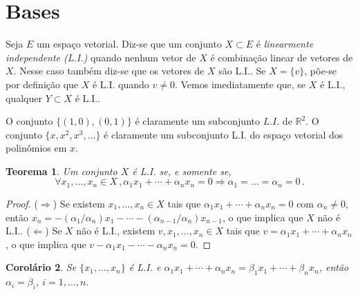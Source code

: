 \documentclass[12pt,a4paper]{article}
\newcommand{\R}{\mathbb{R}}
\newtheorem{thm}{Teorema}[section]
\newtheorem{cor}[thm]{Corolário}
\theoremstyle{definition}
\begin{document}



\section{Bases}

Seja $E$ um espaço vetorial. Diz-se que um conjunto $X\subset E$ é
\textit{linearmente independente (L.I.)} quando nenhum vetor de $X$ é
combinação linear de vetores de $X$. Nesse caso também diz-se que os
vetores de $X$ são L.I.. Se $X=\{v\}$, põe-se por definição que $X$ é
L.I. quando $v\ne 0$. Vemos imediatamente que, se $X$ é L.I., qualquer
$Y\subset X$ é L.I..

O conjunto $\{(1,0), (0,1)\}$ é claramente um subconjunto $L.I.$ de
$\R^2$. O conjunto $\{x, x^2,x^3,\ldots\}$ é claramente um subconjunto
L.I. do espaço vetorial dos polinômios em $x$.

\begin{thm}
  Um conjunto $X$ é L.I. se, e somente se,
  $$\forall x_1,\ldots,x_n\in X\,, \alpha_1x_1+\cdots+\alpha_nx_n=0\Rightarrow
  \alpha_1=\ldots=\alpha_n=0\,.$$
\end{thm}
\begin{proof}
  ($\Rightarrow$) Se existem $x_1,\ldots,x_n\in X$ tais que
  $\alpha_1x_1+\cdots+\alpha_nx_n=0$ com $\alpha_n\ne 0$, então
  $x_n=-(\alpha_1/\alpha_n)x_1-\cdots-(\alpha_{n-1}/\alpha_n)x_{n-1}$,
  o que implica que $X$ não é L.I.. ($\Leftarrow$) Se $X$ não é L.I.,
  existem $v,x_1,\ldots,x_n\in X$ tais que
  $v=\alpha_1x_1+\cdots+\alpha_nx_n$, o que implica que
  $v-\alpha_1x_1-\cdots-\alpha_nx_n=0$.
\end{proof}
\begin{cor}
  \label{thm:2}
  Se $\{x_1,\ldots,x_n\}$ é L.I. e
  $\alpha_1x_1+\cdots+\alpha_nx_n=\beta_1x_1+\cdots+\beta_nx_n$, então
  $\alpha_i=\beta_i$, $i=1,\ldots,n$.
\end{cor}
\end{document}
